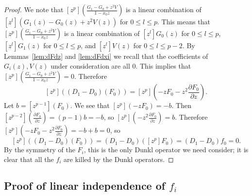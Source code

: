 \documentclass{amsart}
\numberwithin{equation}{section}
\theoremstyle{definition}
\begin{document}
\begin{proof}
We note that $[z^p]\left(\frac{G_1-G_0+z^2V}{1-x_0z}\right)$ is a linear combination of $[z^l](G_1(z)-G_0(z)+z^2V(z))$ for $0 \le l \le p$. This means that $[z^p]\left(\frac{G_1-G_0+z^2V}{1-x_0z}\right)$ is a linear combination of $[z^l]G_0(z)$ for $0 \le l \le p$, $[z^l]G_1(z)$ for $0 \le l \le p$, and $[z^l]V(z)$ for $0 \le l \le p-2$. By Lemmas~\ref{lem:dFdz} and \ref{lem:dFdxi} we recall that the coefficients of $G_i(z),V(z)$ under consideration are all $0$. This implies that $[z^p]\left(\frac{G_1-G_0+z^2V}{1-x_0z}\right)=0$. Therefore
\[
[z^p]\left((D_1-D_0)(F_0)\right)=[z^p]\left(-zF_0-z^2\frac{\partial F_0}{\partial z}\right).
\]
Let $b=[z^{p-1}](F_0)$. We see that $[z^p](-zF_0)=-b$. Then $[z^{p-2}]\left(\frac{\partial F_0}{\partial z}\right)=(p-1)b=-b$, so $[z^p]\left(-z^2\frac{\partial F_0}{\partial z}\right)=b$. Therefore $[z^p]\left(-zF_0-z^2\frac{\partial F_0}{\partial z}\right)=-b+b=0$, so 
\[
[z^p]((D_1-D_0)(F_0))=(D_1-D_0)([z^p]F_0)=(D_1-D_0)f_0=0.
\]
By the symmetry of the $F_i$, this is the only Dunkl operator we need consider; it is clear that all the $f_i$ are killed by the Dunkl operators.
\end{proof}

\subsection{Proof of linear independence of $f_i$}
\end{document}
